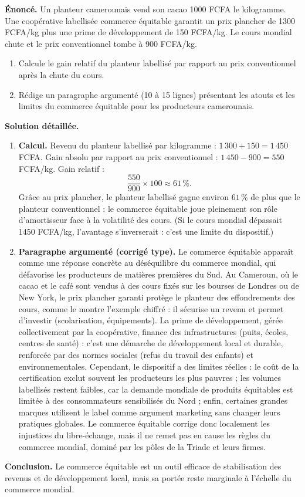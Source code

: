 \documentclass[11pt]{article}
\begin{document}
\begin{exoresolu}
\textbf{Énoncé.} Un planteur camerounais vend son cacao \num{1000} FCFA le kilogramme. Une coopérative labellisée commerce équitable garantit un prix plancher de \num{1300} FCFA/kg plus une prime de développement de \num{150} FCFA/kg. Le cours mondial chute et le prix conventionnel tombe à \num{900} FCFA/kg.
\begin{enumerate}
\item Calcule le gain relatif du planteur labellisé par rapport au prix conventionnel après la chute du cours.
\item Rédige un paragraphe argumenté (10 à 15 lignes) présentant les atouts et les limites du commerce équitable pour les producteurs camerounais.
\end{enumerate}
\tcblower
\textbf{Solution détaillée.}
\begin{enumerate}
\item \textbf{Calcul.} Revenu du planteur labellisé par kilogramme : $1\,300 + 150 = 1\,450$ FCFA. Gain absolu par rapport au prix conventionnel : $1\,450 - 900 = 550$ FCFA/kg. Gain relatif :
\[ \frac{550}{900}\times 100 \approx 61\,\%. \]
Grâce au prix plancher, le planteur labellisé gagne environ $61\,\%$ de plus que le planteur conventionnel : le commerce équitable joue pleinement son rôle d'amortisseur face à la volatilité des cours. (Si le cours mondial dépassait \num{1450} FCFA/kg, l'avantage s'inverserait : c'est une limite du dispositif.)
\item \textbf{Paragraphe argumenté (corrigé type).} Le commerce équitable apparaît comme une réponse concrète au déséquilibre du commerce mondial, qui défavorise les producteurs de matières premières du Sud. Au Cameroun, où le cacao et le café sont vendus à des cours fixés sur les bourses de Londres ou de New York, le prix plancher garanti protège le planteur des effondrements des cours, comme le montre l'exemple chiffré : il sécurise un revenu et permet d'investir (scolarisation, équipements). La prime de développement, gérée collectivement par la coopérative, finance des infrastructures (puits, écoles, centres de santé) : c'est une démarche de développement local et durable, renforcée par des normes sociales (refus du travail des enfants) et environnementales. Cependant, le dispositif a des limites réelles : le coût de la certification exclut souvent les producteurs les plus pauvres ; les volumes labellisés restent faibles, car la demande mondiale de produits équitables est limitée à des consommateurs sensibilisés du Nord ; enfin, certaines grandes marques utilisent le label comme argument marketing sans changer leurs pratiques globales. Le commerce équitable corrige donc localement les injustices du libre-échange, mais il ne remet pas en cause les règles du commerce mondial, dominé par les pôles de la Triade et leurs firmes.
\end{enumerate}
\textbf{Conclusion.} Le commerce équitable est un outil efficace de stabilisation des revenus et de développement local, mais sa portée reste marginale à l'échelle du commerce mondial.
\end{exoresolu}
\end{document}
